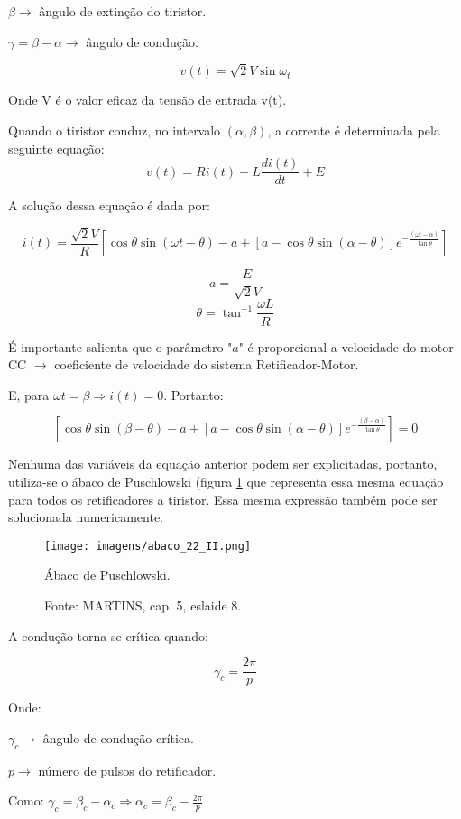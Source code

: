 $\beta \rightarrow$ ângulo de extinção do tiristor.

$\gamma = \beta - \alpha \rightarrow$ ângulo de condução.

\[v(t) = \sqrt{2}V\sin{\omega_{t}}\]

Onde V é o valor eficaz da tensão de entrada v(t).

Quando o tiristor conduz, no intervalo $(\alpha,\beta)$, a corrente é determinada pela seguinte equação:
\[v(t) = Ri(t) + L\frac{di(t)}{dt} + E\]

A solução dessa equação é dada por:

\[i(t) = \frac{\sqrt{2}V}{R}\left[\cos{\theta}\sin({\omega{t} - \theta}) - a + \left[a - \cos{\theta}\sin({\alpha - \theta})\right]e ^{-\frac{(\omega{t} - \alpha)}{\tan{\theta}}}\right]\]

\[a = \frac{E}{\sqrt{2}V}\]
\[\theta = \tan^{-1}{\frac{\omega{L}}{R}}\]

É importante salienta que o parâmetro "$a$" é proporcional a velocidade do motor CC $\rightarrow$ coeficiente de velocidade do sistema Retificador-Motor.

E, para $\omega{t} = \beta \Rightarrow i(t) = 0$. Portanto:

\[\left[\cos{\theta}\sin({\beta - \theta}) - a + \left[a - \cos{\theta}\sin({\alpha - \theta})\right]e ^{-\frac{(\beta - \alpha)}{\tan{\theta}}}\right] = 0\]

Nenhuma das variáveis da equação anterior podem ser explicitadas, portanto, utiliza-se o ábaco de Puschlowski (figura \ref{fig:A-22-II} que representa essa mesma equação para todos os retificadores a tiristor. Essa mesma expressão também pode ser solucionada numericamente.


\begin{figure}[ht!]
\center
\texttt{[image: imagens/abaco\_22\_II.png]}
\caption{\label{fig:A-22-II} Ábaco de Puschlowski.}
\caption*{Fonte: MARTINS, cap. 5, eslaide 8.}
\end{figure}


A condução torna-se crítica quando:

\[ \gamma_{c} = \frac{2\pi}{p}\]

Onde:

$\gamma_{c} \rightarrow$ ângulo de condução crítica.

$p \rightarrow$ número de pulsos do retificador.

Como: $\gamma_{c} = \beta_{c} - \alpha_{c} \Rightarrow \alpha_{c} = \beta_{c} - \frac{2\pi}{p}$

